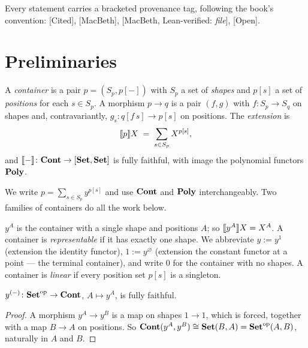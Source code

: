 Every statement carries a bracketed provenance tag, following the book's
convention: \textsf{[Cited]}, \textsf{[MacBeth]}, \textsf{[MacBeth,
Lean-verified: \emph{file}]}, \textsf{[Open]}.

\section{Preliminaries}
\label{sec:prelim}

\begin{Definition}\label{def:container}
A \emph{container} is a pair $p=(S_p, p[-])$ with $S_p$ a set of \emph{shapes}
and $p[s]$ a set of \emph{positions} for each $s\in S_p$. A morphism
$p\to q$ is a pair $(f,g)$ with $f\colon S_p\to S_q$ on shapes and, contravariantly,
$g_s\colon q[f\,s]\to p[s]$ on positions. The \emph{extension} is
\[
   \llbracket p \rrbracket X \;=\; \sum_{s\in S_p} X^{p[s]},
\]
and $\llbracket - \rrbracket\colon\mathbf{Cont}\to[\mathbf{Set},\mathbf{Set}]$ is fully faithful, with image the
polynomial functors $\mathbf{Poly}$.
\end{Definition}

We write $p=\sum_{s\in S_p} y^{p[s]}$ and use $\mathbf{Cont}$ and $\mathbf{Poly}$
interchangeably. Two families of containers do all the work below.

\begin{Definition}\label{def:repr}
$y^A$ is the container with a single shape and positions $A$; so
$\llbracket y^A \rrbracket X = X^A$. A container is \emph{representable} if it has exactly one
shape. We abbreviate $y:=y^1$ (extension the identity functor), $1:=y^{\varnothing}$
(extension the constant functor at a point --- the terminal container), and write
$0$ for the container with no shapes. A container is \emph{linear} if every
position set $p[s]$ is a singleton.
\end{Definition}

\begin{Lemma}\label{lem:yff}
$y^{(-)}\colon\mathbf{Set}^{\mathrm{op}}\to\mathbf{Cont}$, $A\mapsto y^A$, is fully faithful.
\end{Lemma}

\begin{proof}
A morphism $y^A\to y^B$ is a map on shapes $1\to 1$, which is forced, together
with a map $B\to A$ on positions. So $\mathbf{Cont}(y^A,y^B)\cong\mathbf{Set}(B,A)=
\mathbf{Set}^{\mathrm{op}}(A,B)$, naturally in $A$ and $B$.
\end{proof}

